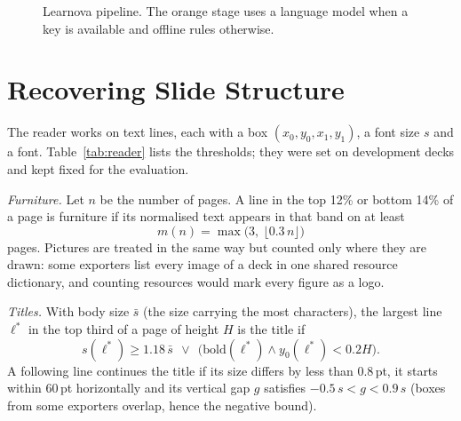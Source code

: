 \documentclass[conference]{IEEEtran}
\begin{document}
\begin{figure}[H]
\centering
{}
\caption{Learnova pipeline. The orange stage uses a language model when a key is available and offline rules otherwise.}
\label{fig:arch}
\end{figure}

\section{Recovering Slide Structure}
\label{sec:reader}
The reader works on text lines, each with a box $(x_0,y_0,x_1,y_1)$, a font size $s$ and a font. Table~\ref{tab:reader}
lists the thresholds; they were set on development decks and kept fixed for the evaluation.

\textit{Furniture.} Let $n$ be the number of pages. A line in the top 12\% or bottom 14\% of a page is furniture if its
normalised text appears in that band on at least
\begin{equation}
m(n)=\max\bigl(3,\ \lfloor 0.3\,n\rfloor\bigr)
\label{eq:furn}
\end{equation}
pages. Pictures are treated in the same way but counted only where they are drawn: some exporters list every image of a
deck in one shared resource dictionary, and counting resources would mark every figure as a logo.

\textit{Titles.} With body size $\bar s$ (the size carrying the most characters), the largest line $\ell^{*}$ in the top
third of a page of height $H$ is the title if
\begin{equation}
s(\ell^{*})\ge 1.18\,\bar s\ \ \lor\ \ \bigl(\mathrm{bold}(\ell^{*})\land y_0(\ell^{*})<0.2H\bigr).
\end{equation}
A following line continues the title if its size differs by less than 0.8\,pt, it starts within 60\,pt horizontally and its
vertical gap $g$ satisfies $-0.5\,s<g<0.9\,s$ (boxes from some exporters overlap, hence the negative bound).
\end{document}

